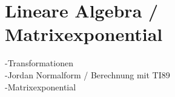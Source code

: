 \section{Lineare Algebra / Matrixexponential}
-Transformationen\\
-Jordan Normalform / Berechnung mit TI89\\
-Matrixexponential 